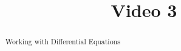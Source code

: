 \documentclass[handout]{ximera}
\title{Video 3}
\begin{document}
\begin{abstract}
Working with Differential Equations
\end{abstract}

\maketitle

\end{document}
